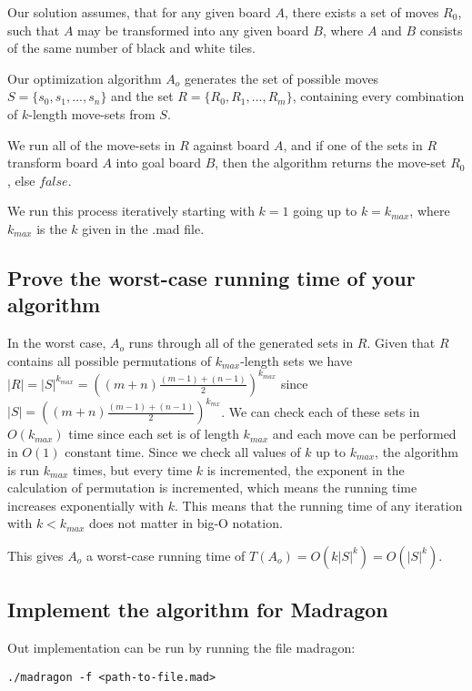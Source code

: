 \documentclass[12pt]{article}
\begin{document}
Our solution assumes, that for any given board $A$, there exists a set of moves $R_0$, such that $A$ may be transformed into any given board $B$, where $A$ and $B$ consists of the same number of black and white tiles.

Our optimization algorithm $A_o$ generates the set of possible moves $S = \{s_0, s_1, ...,s_n\}$ and the set $R = \{R_0, R_1, ..., R_m\}$, containing every combination of $k$-length move-sets from $S$.

We run all of the move-sets in $R$ against board $A$, and if one of the sets in $R$ transform board $A$ into goal board $B$, then the algorithm returns the move-set $R_0$, else $false$.

We run this process iteratively starting with $k = 1$ going up to $k = k_{max}$, where $k_{max}$ is the $k$ given in the .mad file.

\subsection{Prove the worst-case running time of your algorithm}
\label{sub:Prove the worst-case running time of your algorithm}

In the worst case, $A_o$ runs through all of the generated sets in $R$. Given that $R$ contains all possible permutations of $k_{max}$-length sets we have $|R| = |S|^{k_{max}} = ((m+n)\frac{(m-1)+(n-1)}{2})^{k_{max}}$ since $|S| = ((m+n)\frac{(m-1)+(n-1)}{2})^{k_{mx}}$. We can check each of these sets in $O(k_{max})$ time since each set is of length $k_{max}$ and each move can be performed in $O(1)$ constant time. Since we check all values of $k$ up to $k_{max}$, the algorithm is run $k_{max}$ times, but every time $k$ is incremented, the exponent in the calculation of permutation is incremented, which means the running time increases exponentially with $k$. This means that the running time of any iteration with $k < k_{max}$ does not matter in big-O notation.

This gives $A_o$ a worst-case running time of $T(A_o) = O(k|S|^k) = O(|S|^k)$.

\subsection{Implement the algorithm for Madragon}
\label{sub:Implement the algorithm for Madragon}

Out implementation can be run by running the file madragon:

\begin{lstlisting}
./madragon -f <path-to-file.mad>
\end{lstlisting}
\end{document}
